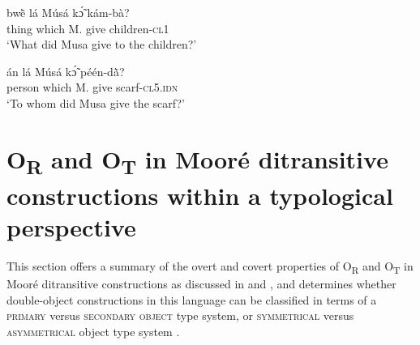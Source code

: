 \documentclass[output=paper]{langsci/langscibook}
\begin{document}
\ea
\label{ex:45.pacchiarotti}
\gll bw\`{ẽ}    lá    Músá  kɔ̃́  kám-bà?  \\
thing    which    M.  give  children-\textsc{cl1}\\
\glt `What did Musa give to the children?'
\z

\ea
\label{ex:46.pacchiarotti}
\gll án    lá    Músá  kɔ̃́  péén-d\`{ã}? \\
person  which    M.  give  scarf-\textsc{cl5.idn}\\
\glt `To whom did Musa give the scarf?'
\z

\section{O\textsubscript{R} and O\textsubscript{T} in Mooré ditransitive constructions within a typological perspective}\label{§6:or.pacchiarotti}

This section offers a summary of the overt and covert properties of O\textsubscript{R} and O\textsubscript{T} in Mooré ditransitive constructions as discussed in  and , and determines whether double-object constructions in this language can be classified in terms of a \textsc{primary} versus \textsc{secondary object} \citep{dryer1986} type system, or \textsc{symmetrical} versus \textsc{asymmetrical} object type system \citep{bresnanmoshi1990}.
\end{document}
